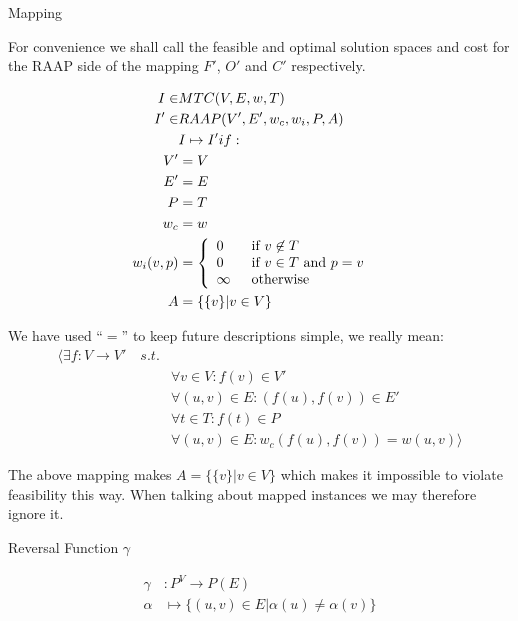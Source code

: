 \documentclass{article}
\begin{document}
\begin{definition}
Mapping

For convenience we shall call the feasible and optimal solution spaces and cost for the RAAP side of the mapping $F'$, $O'$ and $C'$ respectively.

\begin{align}
	\nonumber I \in & MTC(V,E,w,T) &\\
	\nonumber I' \in & RAAP(V', E', w_c, w_i, P, A) &\\
	\nonumber & I \mapsto I' if: &\\
	\nonumber V' & = V\\
	\nonumber E' & = E\\
	\nonumber P & = T\\
	\nonumber w_c & = w\\
	\nonumber w_i(v,p) & = \mbox{$\left\{ 
		\begin{array}{l l}
			0 \quad & \mbox{if $v \not\in T$}\\
			0 & \mbox{if $v \in T$ and $p = v$}\\
			\infty & \mbox{otherwise}\\ \end{array} \right.$} \\
	\nonumber A & = \{\{v\} | v \in V\}
\end{align}

We have used ``$=$'' to keep future descriptions simple, we really mean:
\begin{align}
	\nonumber \langle \exists f : V \rightarrow V' \quad s.t. & \\
	\nonumber & \forall v \in V : f(v) \in V'\\
	\nonumber & \forall (u, v) \in E : (f(u), f(v)) \in E' \\
	\nonumber & \forall t \in T : f(t) \in P\\
	\nonumber & \forall (u, v) \in E : w_c(f(u), f(v)) = w(u, v) \rangle
\end{align}

The above mapping makes $A = \{\{v\} | v \in V\}$ which makes it impossible to violate feasibility this way.
When talking about mapped instances we may therefore ignore it.
\end{definition}

\begin{definition}
Reversal Function $\gamma$

\begin{align}
	\nonumber \gamma & : P^V \rightarrow P(E) \\
	\nonumber \alpha & \mapsto \{(u,v) \in E | \alpha(u) \neq \alpha(v)\}
\end{align}
\end{definition}
\end{document}
